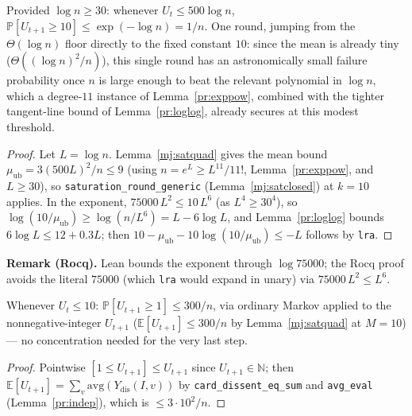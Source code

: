 \begin{lemma}[Stage 2b]\label{mj:stage2b}
  \rocqok
  Provided $\log n\ge30$: whenever $U_t\le500\log n$,
  $\mathbb{P}[U_{t+1}\ge10] \le \exp(-\log n) = 1/n$. One round, jumping from
  the $\Theta(\log n)$ floor directly to the fixed constant $10$: since the
  mean is already tiny ($\Theta((\log n)^2/n)$), this single round has an
  astronomically small failure probability once $n$ is large enough to beat
  the relevant polynomial in $\log n$, which a degree-$11$ instance of
  Lemma~\ref{pr:exppow}, combined with the tighter tangent-line bound of
  Lemma~\ref{pr:loglog}, already secures at this modest threshold.
\end{lemma}
\begin{proof}
  \rocqok
  Let $L = \log n$. Lemma~\ref{mj:satquad} gives the mean bound
  $\mu_{\mathrm{ub}} = 3(500L)^2/n \le 9$ (using $n = e^L \ge L^{11}/11!$,
  Lemma~\ref{pr:exppow}, and $L \ge 30$), so
  \texttt{saturation\_round\_generic} (Lemma~\ref{mj:satclosed}) at $k = 10$
  applies. In the exponent, $75000\,L^2 \le 10\,L^6$ (as $L^4 \ge 30^4$), so
  $\log(10/\mu_{\mathrm{ub}}) \ge \log(n/L^6) = L - 6\log L$, and
  Lemma~\ref{pr:loglog} bounds $6 \log L \le 12 + 0.3 L$; then
  $10 - \mu_{\mathrm{ub}} - 10\log(10/\mu_{\mathrm{ub}}) \le -L$ follows by
  \texttt{lra}.
\end{proof}

\noindent\textbf{Remark (Rocq).} Lean bounds the exponent through
$\log 75000$; the Rocq proof avoids the literal $75000$ (which
\texttt{lra} would expand in unary) via $75000\,L^2 \le L^6$.

\begin{lemma}[Stage 2c]\label{mj:stage2c}
  \rocqok
  Whenever $U_t\le10$: $\mathbb{P}[U_{t+1}\ge1] \le 300/n$, via ordinary
  Markov applied to the nonnegative-integer $U_{t+1}$
  ($\mathbb{E}[U_{t+1}]\le300/n$ by Lemma~\ref{mj:satquad} at $M=10$) --- no
  concentration needed for the very last step.
\end{lemma}
\begin{proof}
  \rocqok
  Pointwise $[1 \le U_{t+1}] \le U_{t+1}$ since $U_{t+1} \in \mathbb{N}$;
  then $\mathbb{E}[U_{t+1}] = \sum_v \mathrm{avg}(Y_{\mathrm{dis}}(I,v))$ by
  \texttt{card\_dissent\_eq\_sum} and \texttt{avg\_eval}
  (Lemma~\ref{pr:indep}), which is $\le 3\cdot 10^2/n$.
\end{proof}

